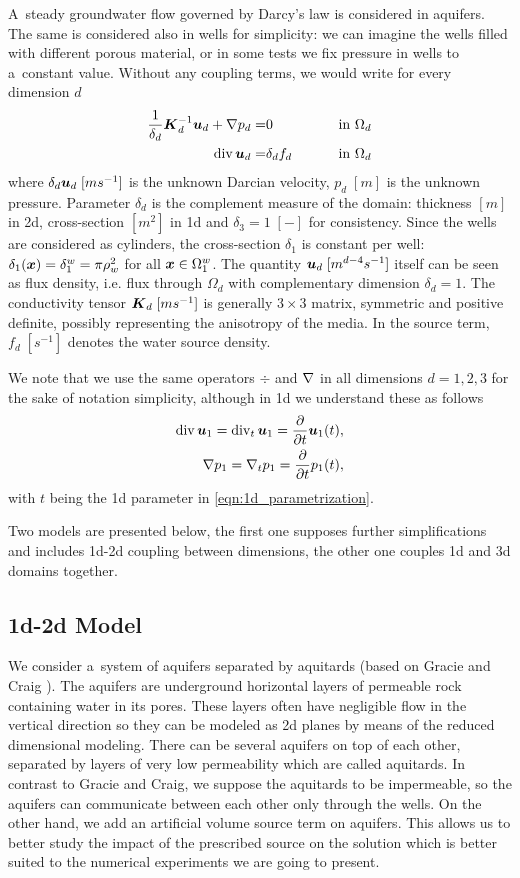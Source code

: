 A~steady groundwater flow governed by Darcy's law is considered in aquifers.
The same is considered also in wells for simplicity:
we can imagine the wells filled with different porous material, or in some tests we fix pressure in wells to a~constant value.
Without any coupling terms, we would write for every dimension $d$
\begin{eqnarray}
     \frac{1}{\delta_d} \mathbf{\boldsymbol{K}}_d^{-1} \mathbf{\boldsymbol{u}}_d + \nabla p_d =& 0  &\qquad \textrm{ in }\Omega_d\\
      {\rm div}\,\mathbf{\boldsymbol{u}}_d  =& \delta_d f_d  &\qquad \textrm{ in }\Omega_d
\end{eqnarray}
where $\delta_d\mathbf{\boldsymbol{u}}_d\; [ms^{-1}]$ is the unknown Darcian velocity, $p_d \; [m]$ is the unknown pressure.
Parameter $\delta_d$ is the complement measure of the domain: thickness $[m]$ in 2d,
cross-section $[m^2]$ in 1d and $\delta_3=1\; [-]$ for consistency. Since the wells are considered as cylinders,
the cross-section $\delta_1$ is constant per well: $\delta_1(\mathbf{\boldsymbol{x}})=\delta^w_1=\pi\rho^2_w$ for all $\mathbf{\boldsymbol{x}}\in \Omega^w_1$.
The quantity $\mathbf{\boldsymbol{u}}_d\; [m^{d-4}s^{-1}]$ itself can be seen as flux density, i.e. flux through $\Omega_d$
with complementary dimension $\delta_d=1$.
The conductivity tensor $\mathbf{\boldsymbol{K}}_d\; [ms^{-1}]$ is generally $3\times 3$ matrix,
symmetric and positive definite, possibly representing the anisotropy of the media.
In the source term, $f_d\;[s^{-1}]$ denotes the water source density.

We note that we use the same operators $\div$ and $\nabla$ in all dimensions $d=1,2,3$ for the sake of notation simplicity,
although in 1d we understand these as follows
\begin{eqnarray}
{\rm div}\,\mathbf{\boldsymbol{u}}_1 = {\rm div}_t\,\mathbf{\boldsymbol{u}}_1 = \frac{\partial}{\partial t} \mathbf{\boldsymbol{u}}_1(t), \\
\nabla p_1 = \nabla_t p_1 = \frac{\partial}{\partial t} p_1(t),
\end{eqnarray}
with $t$ being the 1d parameter in \eqref{eqn:1d_parametrization}.

Two models are presented below, the first one supposes further simplifications and includes 1d-2d coupling between dimensions,
the other one couples 1d and 3d domains together.


\subsection{1d-2d Model}
We consider a~system of aquifers separated by aquitards
(based on Gracie and Craig \cite{gracie_modelling_2010,craig_using_2011}).
The aquifers are underground horizontal layers of permeable rock containing water in its pores.
These layers often have negligible flow in the vertical direction so they can be modeled
as 2d planes by means of the reduced dimensional modeling.
There can be several aquifers on top of each other, separated by layers of very low permeability
which are called aquitards.
In contrast to Gracie and Craig, we suppose the aquitards to be impermeable, 
so the aquifers can communicate between each other only through the wells.
On the other hand, we add an artificial volume source term on aquifers.
This allows us to better study the impact of the prescribed source on the solution
which is better suited to the numerical experiments we are going to present. 

